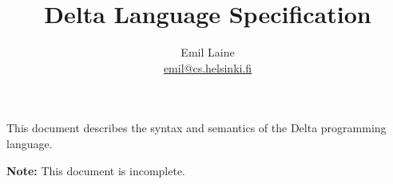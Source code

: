 \documentclass[oneside]{memoir}
\begin{document}
\title{Delta Language Specification}
\author{Emil Laine \\ \href{mailto:emil@cs.helsinki.fi}{emil@cs.helsinki.fi}}
\maketitle

This document describes the syntax and semantics of the Delta programming language.

\textbf{Note:} This document is incomplete.

\tableofcontents






\end{document}
